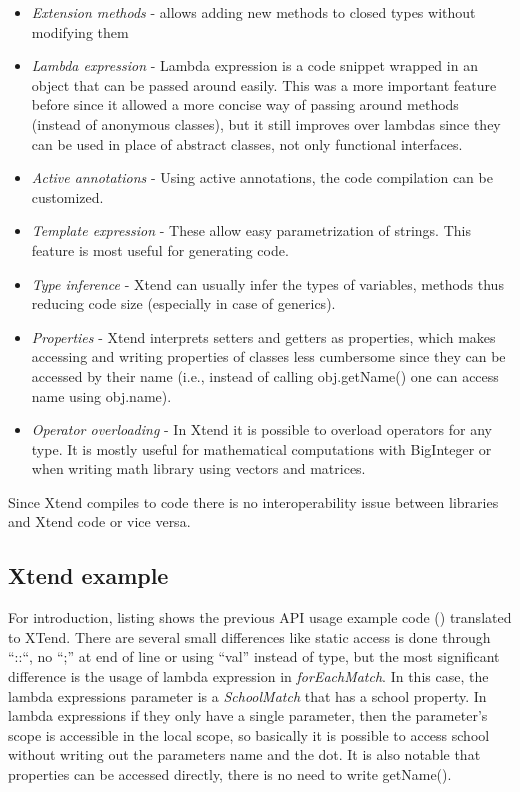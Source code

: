 \begin{itemize}
  \item \emph{Extension methods} - allows adding new methods to closed types
  without modifying them
  \item \emph{Lambda expression} - Lambda expression is a code snippet wrapped
  in an object that can be passed around easily. This was a more important
  feature before  since it allowed a more concise way of passing around
  methods (instead of anonymous classes), but it still improves over 
  lambdas since they can be used in place of abstract classes, not only
  functional interfaces.
  \item \emph{Active annotations} - Using active annotations, the \Java code
  compilation can be customized.
  \item \emph{Template expression} - These allow easy parametrization of
  strings. This feature is most useful for generating code.
  \item \emph{Type inference} - Xtend can usually infer the types of variables,
  methods thus reducing code size (especially in case of generics).
  \item \emph{Properties} - Xtend interprets setters and getters as properties,
  which makes accessing and writing properties of classes less cumbersome since
  they can be accessed by their name (i.e., instead of calling
  obj.getName() one can access name using obj.name).
  \item \emph{Operator overloading} - In Xtend it is possible to overload
  operators for any type. It is mostly useful for mathematical computations with
  BigInteger or when writing math library using vectors and matrices.
\end{itemize}

Since Xtend compiles to \Java code there is no interoperability issue between
\Java libraries and Xtend code or vice versa.

\subsection{Xtend example}

For introduction, listing  shows the previous \EIQ API usage
example code () translated to XTend. There are several
small differences like static access is done through ``::``, no ``;'' at end of
line or using ``val'' instead of type, but the most significant difference is
the usage of lambda expression in \emph{forEachMatch}. In this case, the lambda
expressions parameter is a \emph{SchoolMatch} that has a school property. In
lambda expressions if they only have a single parameter, then the parameter's
scope is accessible in the local scope, so basically it is possible to access
school without writing out the parameters name and the dot. It is also notable
that properties can be accessed directly, there is no need to write getName().

